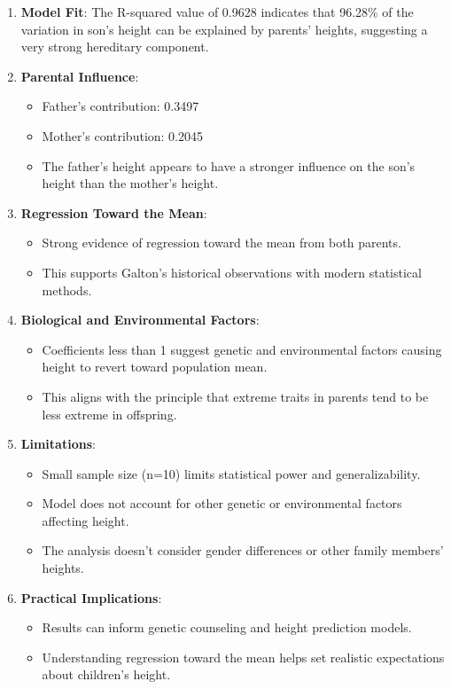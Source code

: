 \documentclass[12pt]{article}
\begin{document}
\begin{enumerate}
    \item \textbf{Model Fit}: The R-squared value of 0.9628 indicates that 96.28\% of the variation in son's height can be explained by parents' heights, suggesting a very strong hereditary component.

    \item \textbf{Parental Influence}:
        \begin{itemize}
            \item Father's contribution: 0.3497
            \item Mother's contribution: 0.2045
            \item The father's height appears to have a stronger influence on the son's height than the mother's height.
        \end{itemize}

    \item \textbf{Regression Toward the Mean}:
        \begin{itemize}
            \item Strong evidence of regression toward the mean from both parents.
            \item This supports Galton's historical observations with modern statistical methods.
        \end{itemize}

    \item \textbf{Biological and Environmental Factors}:
        \begin{itemize}
            \item Coefficients less than 1 suggest genetic and environmental factors causing height to revert toward population mean.
            \item This aligns with the principle that extreme traits in parents tend to be less extreme in offspring.
        \end{itemize}

    \item \textbf{Limitations}:
        \begin{itemize}
            \item Small sample size (n=10) limits statistical power and generalizability.
            \item Model does not account for other genetic or environmental factors affecting height.
            \item The analysis doesn't consider gender differences or other family members' heights.
        \end{itemize}

    \item \textbf{Practical Implications}:
        \begin{itemize}
            \item Results can inform genetic counseling and height prediction models.
            \item Understanding regression toward the mean helps set realistic expectations about children's height.
        \end{itemize}
\end{enumerate}
\end{document}
